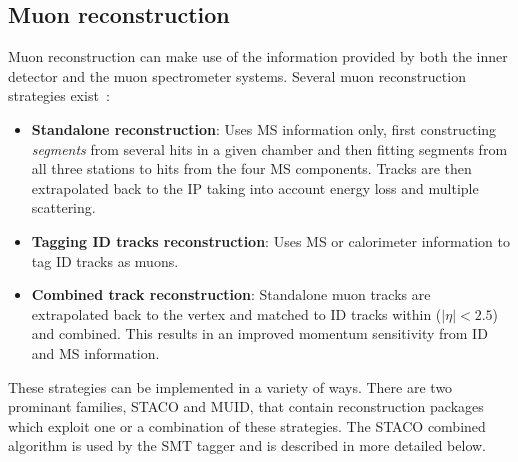 \subsection{Muon reconstruction} \label{sec:DetectorMuReco}

Muon reconstruction can make use of the information provided by both the inner detector and the muon spectrometer systems. Several muon reconstruction strategies exist~\cite{Detector:MuonReconstructionList}:

\begin{itemize}
  \item \textbf{Standalone reconstruction}: Uses MS information only, first constructing \emph{segments} from several hits in a given chamber and then fitting segments from all three stations to hits from the four MS components. Tracks are then extrapolated back to the IP taking into account energy loss and multiple scattering.
  \item \textbf{Tagging ID tracks reconstruction}: Uses MS or calorimeter information to tag ID tracks as muons.
  \item \textbf{Combined track reconstruction}: Standalone muon tracks are extrapolated back to the vertex and matched to ID tracks within ($|\eta|<2.5$) and combined. This results in an improved momentum sensitivity from ID and MS information. 
\end{itemize}

These strategies can be implemented in a variety of ways. There are two prominant families, STACO and MUID, that contain reconstruction packages which exploit one or a combination of these strategies. The STACO combined algorithm is used by the SMT tagger and is described in more detailed below.

